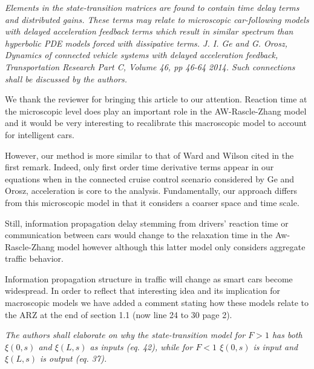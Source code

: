 \documentclass{article}
\begin{document}
\bigskip{}

\emph{
Elements in the state-transition matrices are found to contain time delay terms and distributed gains. These terms may relate to microscopic car-following models with delayed acceleration feedback terms which result in similar spectrum than hyperbolic PDE models forced with dissipative terms. J. I. Ge and G. Orosz, Dynamics of connected vehicle systems with delayed acceleration feedback, Transportation Research Part C, Volume 46, pp 46-64 2014. Such connections shall be discussed by the authors.
}

We thank the reviewer for bringing this article to our attention. Reaction time at the microscopic level does play an important role in the AW-Rascle-Zhang model and it would be very interesting to recalibrate this macroscopic model to account for intelligent cars. 

However, our method is more similar to that of Ward and Wilson cited in the first remark. Indeed, only first order time derivative terms appear in our equations when in the connected cruise control scenario considered by Ge and Orosz, acceleration is core to the analysis. Fundamentally, our approach differs from this microscopic model in that it considers a coarser space and time scale. 

Still, information propagation delay stemming from drivers' reaction time or communication between cars would change to the relaxation time in the Aw-Rascle-Zhang model however although this latter model only considers aggregate traffic behavior.

Information propagation structure in traffic will change as smart cars become widespread. In order to reflect that interesting idea and its implication for macroscopic models we have added a comment stating how these models relate to the ARZ at the end of section 1.1 (now line 24 to 30 page 2).

\bigskip{}

\emph{
The authors shall elaborate on why the state-transition model for $F>1$ has both $\xi(0,s)$ and $\xi(L,s)$ as inputs (eq. 42), while for $F<1$ $\xi(0,s)$ is input and $\xi(L,s)$ is output (eq. 37).
}
\end{document}

